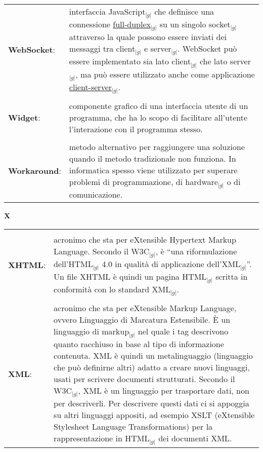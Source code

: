 \begin{longtable}{p{} p{}}
	    \\
	    \textbf{WebSocket}:		&	interfaccia JavaScript$_{|g|}$ che definisce una connessione \underline{full-duplex}$_{|g|}$ su un singolo socket$_{|g|}$ attraverso la quale possono essere inviati dei messaggi tra client$_{|g|}$ e server$_{|g|}$.
						WebSocket può essere implementato sia lato client$_{|g|}$ che lato server$_{|g|}$, ma può essere utilizzato anche come applicazione \underline{client-server}$_{|g|}$.\\
	    \\
	    \textbf{Widget}: 		&	componente grafico di una interfaccia utente di un programma, che ha lo scopo di facilitare all'utente l'interazione con il programma stesso.\\
	    \\
	    \textbf{Workaround}:	&	metodo alternativo per raggiungere una soluzione quando il metodo tradizionale non funziona. In informatica spesso viene utilizzato per superare problemi di programmazione, di hardware$_{|g|}$ o di comunicazione.\\
	\end{longtable}
\newpage

\hfill\Huge{\textbf{X}}\\
\normalsize
\label{tabVers}
	\begin{longtable}{p{} p{}} 
	    \toprule
	    \\
	    \textbf{XHTML}:	&	acronimo che sta per eXtensible Hypertext Markup Language. Secondo il W3C$_{|g|}$, è “una riformulazione dell'HTML$_{|g|}$ 4.0 in qualità di applicazione dell'XML$_{|g|}$”. 
					Un file XHTML è quindi un pagina HTML$_{|g|}$ scritta in conformità con lo standard XML$_{|g|}$.\\
	    \\
	    \textbf{XML}:	&	acronimo che sta per eXtensible Markup Language, ovvero Linguaggio di Marcatura Estensibile. \`E un linguaggio di markup$_{|g|}$ nel quale i tag descrivono quanto racchiuso in base al tipo di informazione contenuta. 
					XML è quindi un metalinguaggio (linguaggio che può definirne altri) adatto a creare nuovi linguaggi, usati per scrivere documenti strutturati. Secondo il W3C$_{|g|}$, XML è un linguaggio per trasportare dati, non per descriverli. 
					Per descrivere questi dati ci si appoggia su altri linguaggi appositi, ad esempio XSLT (eXtensible Stylesheet Language Transformations) per la rappresentazione in HTML$_{|g|}$ dei documenti XML.
	\end{longtable}
\newpage
